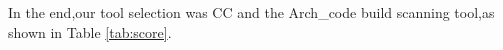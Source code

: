 \documentclass[sigconf,screen,review,anonymous]{acmart}
\begin{document}
In the end,our tool selection was CC and the Arch\_code build scanning tool,as shown in Table \ref{tab:score}.






\end{document}
